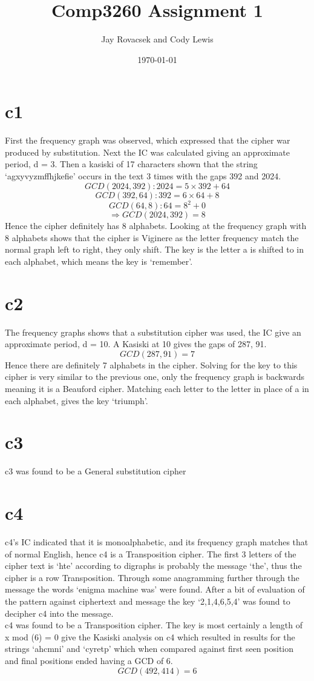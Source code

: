 \documentclass{article}
\title{Comp3260 Assignment 1}
\author{Jay Rovacsek and Cody Lewis}
\date{\today}
\begin{document}
  \maketitle

  \section{c1}
    First the frequency graph was observed, which expressed that the cipher
    war produced by substitution. Next the IC was calculated giving an 
    approximate period, d = 3. Then a kasiski of 17 characters shown that the
    string `agxyvyzmffhjkefie' occurs in the text 3 times with the gaps
    392 and 2024.
      \[ GCD(2024,392): 2024 = 5 \times 392 + 64 \] 
      \[ GCD(392,64): 392 = 6 \times 64 + 8 \] 
      \[ GCD(64,8): 64 = 8^2 + 0 \] 
      \[ \Rightarrow GCD(2024,392) = 8 \] 
    Hence the cipher definitely has 8 alphabets. Looking at the frequency 
    graph with 8 alphabets shows that the cipher is Viginere as the letter 
    frequency match the normal graph left to right, they only shift. The 
    key is the letter a is shifted to in each alphabet, which means the key 
    is `remember'.
  \section{c2}
    The frequency graphs shows that a substitution cipher was used, the IC
    give an approximate period, d = 10. A Kasiski at 10 gives the gaps of 287,
    91.
      \[ GCD(287,91) = 7 \]
    Hence there are definitely 7 alphabets in the cipher. Solving for the key
    to this cipher is very similar to the previous one, only the frequency 
    graph is backwards meaning it is a Beauford cipher. Matching each letter
    to the letter in place of a in each alphabet, gives the key `triumph'.
  \section{c3}
    c3 was found to be a General substitution cipher
  \section{c4}
    c4's IC indicated that it is monoalphabetic, and its frequency graph matches that
    of normal English, hence c4 is a Transposition cipher. The first 3 letters of the
    cipher text is `hte' according to digraphs is probably the message `the', thus the
    cipher is a row Transposition. Through some anagramming further through the message 
    the words `enigma machine was' were found. After a bit of evaluation of the pattern 
    against ciphertext and message the key `2,1,4,6,5,4' was found to decipher c4 into the
    message. \\
    c4 was found to be a Transposition cipher. The key is most certainly a length of 
    x mod (6) = 0 give the Kasiski analysis on c4 which resulted in results for the
    strings `ahcmni' and `cyretp' which when compared against first seen position and
    final positions ended having a GCD of 6.
      \[ GCD(492,414) = 6 \]
\end{document}
